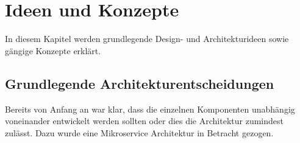 \chapter{Ideen und Konzepte}




%



%
%

In diesem Kapitel werden grundlegende Design- und Architekturideen sowie gängige Konzepte erklärt.

\section{Grundlegende Architekturentscheidungen}
\label{konzepte:microservices}

Bereits von Anfang an war klar, dass die einzelnen Komponenten unabhängig voneinander
entwickelt werden sollten oder dies die Architektur zumindest zulässt. Dazu wurde
eine Mikroservice Architektur in Betracht gezogen.

